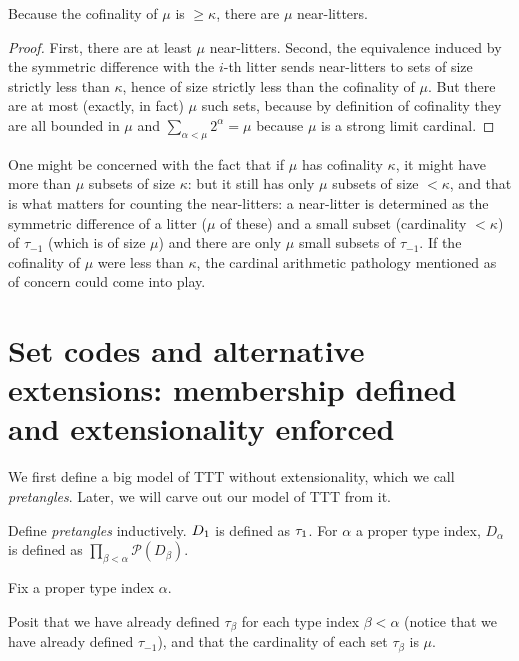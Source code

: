 \begin{lemma}
\label {lem:count-near-litters}
\leanok
{}
Because the cofinality of $\mu$ is $\geq \kappa$, there are $\mu$ near-litters.
\end{lemma}

\begin{proof}
\leanok
First, there are at least $\mu$ near-litters. Second, the equivalence induced by the symmetric difference with the $i$-th litter sends near-litters to sets of size strictly less than $\kappa$, hence of size strictly less than the cofinality of $\mu$. But there are at most (exactly, in fact) $\mu$ such sets, because by definition of cofinality they are all bounded in $\mu$ and $\sum_{\alpha < \mu} 2 ^ \alpha = \mu $ because $\mu$ is a strong limit cardinal.
\end{proof}

One might be concerned with the fact that if $\mu$ has cofinality $\kappa$, it might have more than $\mu$ subsets of size $\kappa$:  but it still has only $\mu$ subsets of size $<\kappa$, and that is what matters for counting the near-litters:  a near-litter is determined as the symmetric difference of a litter ($\mu$ of these) and a small subset (cardinality $<\kappa$) of $\tau_{-1}$ (which is of size $\mu$) and there are only $\mu$ small subsets of $\tau_{-1}$.  If the cofinality of $\mu$ were less than $\kappa$, the cardinal arithmetic pathology mentioned as of concern could come into play.

\section{Set codes and alternative extensions:  membership defined and extensionality enforced}

We first define a big model of TTT without extensionality, which we call {\em pretangles}. Later, we will carve out our model of TTT from it.

\begin{definition}
\label {def:pretangle}
\leanok
{}
Define {\em pretangles} inductively. $D_{\-1}$ is defined as $\tau_{\-1}$. For $\alpha$ a proper type index, $D_\alpha$ is defined as $\prod_{\beta < \alpha} \mathcal P (D_\beta)$.
\end{definition}

\begin{definition}
\label {def:recursion-motor}
Fix a proper type index $\alpha$.

Posit that we have already defined $\tau_\beta$ for each type index $\beta<\alpha$ (notice that we have already defined $\tau_{-1}$), and that the cardinality of each set $\tau_\beta$ is $\mu$.
\end{definition}

